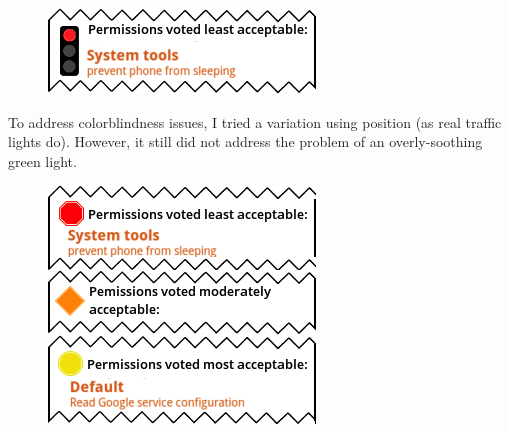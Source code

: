 \documentclass[11pt]{article}
\begin{document}
\begin{figure}
\begin{center}
\includegraphics[width=.9\linewidth]{candidate-img/traffic/trafficR3.png}
\end{center}
\end{figure}

To address colorblindness issues, I tried a variation using position
(as real traffic lights do). However, it still did not address
the problem of an overly-soothing green light. \\



\begin{figure}
\begin{center}
\includegraphics[width=.9\linewidth]{candidate-img/traffic/trafficR4.png}
\end{center}
\end{figure}
\end{document}
